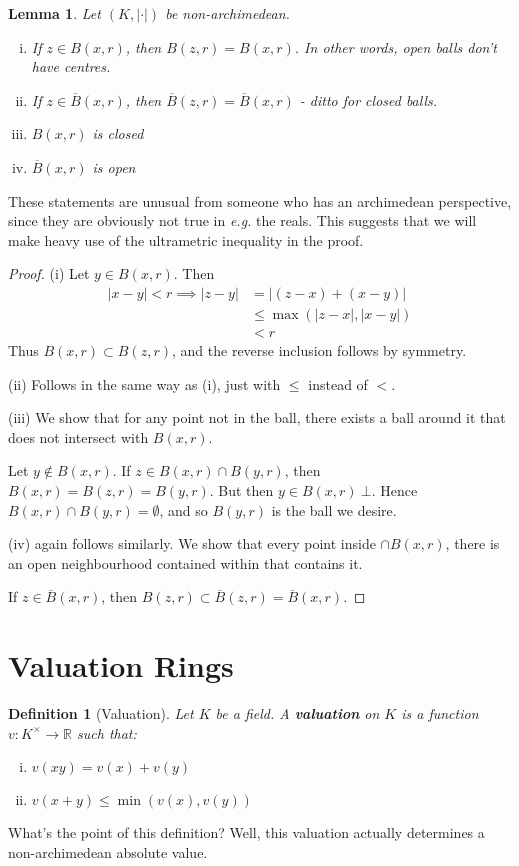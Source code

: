 \documentclass[]{article}
\theoremstyle{custhm}
\theoremstyle{cusdef}
\newtheorem{defin}[theorem]{Definition}
\theoremstyle{custhm}
\newtheorem{lemma}[theorem]{Lemma}
\theoremstyle{custhm}
\theoremstyle{custhm}
\theoremstyle{custhm}
\theoremstyle{cusdef}
\theoremstyle{remark}
\newcommand{\R}{\mathbb{R}}
\newcommand{\ra}{\rightarrow}
\newcommand{\undf}[1]{\textit{\textbf{#1}}}
\renewcommand{\it}[1]{\textit{#1}}
\newcommand{\val}[1]{\left|#1\right|}
\newcommand{\valk}{(K,|\cdot|)}
\renewcommand{\bar}{\overline}
\begin{document}
\begin{lemma}
	Let $\valk$ be non-archimedean.
	\begin{enumerate}[(i)]
		\item If $z\in B(x,r)$, then $B(z,r) = B(x,r)$. In other words, open balls don't have centres.
		\item If $z\in \bar{B}(x,r)$, then $\bar{B}(z,r) = \bar{B}(x,r)$ - ditto for closed balls.
		\item $B(x,r)$ is closed
		\item $\bar{B}(x,r)$ is open
	\end{enumerate}
\end{lemma}
These statements are unusual from someone who has an archimedean perspective, since they are obviously not true in \it{e.g.} the reals. This suggests that we will make heavy use of the ultrametric inequality in the proof.
\begin{proof}
(i) Let $y\in B(x,r)$. Then
\begin{align*}
	\val{x-y} < r\implies \val{z-y} &= \val{(z-x) + (x-y)}\\
	&\le \max(|z-x|,|x-y|)\\
	&< r
\end{align*}
Thus $B(x,r)\subset B(z,r)$, and the reverse inclusion follows by symmetry.

(ii) Follows in the same way as (i), just with $\le$ instead of $<$.

(iii) We show that for any point not in the ball, there exists a ball around it that does not intersect with $B(x,r)$.

Let $y\not\in B(x,r)$. If $z\in B(x,r)\cap B(y,r)$, then $B(x,r) = B(z,r) = B(y,r)$. But then $y\in B(x,r)\ \bot$. Hence $B(x,r)\cap B(y,r) = \emptyset$, and so $B(y,r)$ is the ball we desire.

(iv) again follows similarly. We show that every point inside $\cap{B}(x,r)$, there is an open neighbourhood contained within that contains it.

If $z\in \bar{B}(x,r)$, then $B(z,r) \subset \bar{B}(z,r) = \bar{B}(x,r)$.
\end{proof}

\section{Valuation Rings}

\begin{defin}[Valuation]
	Let $K$ be a field. A \undf{valuation} on $K$ is a function $v:K^\times \ra \R$ such that:
	\begin{enumerate}[(i)]
		\item $v(xy) = v(x) + v(y)$
		\item $v(x+y) \le \min(v(x),v(y))$
	\end{enumerate}
\end{defin}
What's the point of this definition? Well, this valuation actually determines a non-archimedean absolute value.
\end{document}
